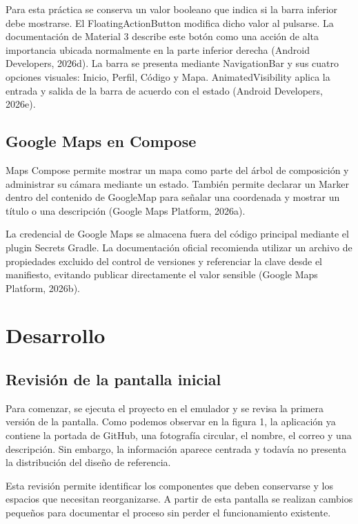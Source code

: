 \documentclass[12pt,a4paper]{article}
\begin{document}
Para esta práctica se conserva un valor booleano que indica si la barra inferior debe mostrarse. El FloatingActionButton modifica dicho valor al pulsarse. La documentación de Material 3 describe este botón como una acción de alta importancia ubicada normalmente en la parte inferior derecha (Android Developers, 2026d). La barra se presenta mediante NavigationBar y sus cuatro opciones visuales: Inicio, Perfil, Código y Mapa. AnimatedVisibility aplica la entrada y salida de la barra de acuerdo con el estado (Android Developers, 2026e).

\subsection{Google Maps en Compose}

Maps Compose permite mostrar un mapa como parte del árbol de composición y administrar su cámara mediante un estado. También permite declarar un Marker dentro del contenido de GoogleMap para señalar una coordenada y mostrar un título o una descripción (Google Maps Platform, 2026a).

La credencial de Google Maps se almacena fuera del código principal mediante el plugin Secrets Gradle. La documentación oficial recomienda utilizar un archivo de propiedades excluido del control de versiones y referenciar la clave desde el manifiesto, evitando publicar directamente el valor sensible (Google Maps Platform, 2026b).

\section{Desarrollo}

\subsection{Revisión de la pantalla inicial}

Para comenzar, se ejecuta el proyecto en el emulador y se revisa la primera versión de la pantalla. Como podemos observar en la figura 1, la aplicación ya contiene la portada de GitHub, una fotografía circular, el nombre, el correo y una descripción. Sin embargo, la información aparece centrada y todavía no presenta la distribución del diseño de referencia.

Esta revisión permite identificar los componentes que deben conservarse y los espacios que necesitan reorganizarse. A partir de esta pantalla se realizan cambios pequeños para documentar el proceso sin perder el funcionamiento existente.
\end{document}
